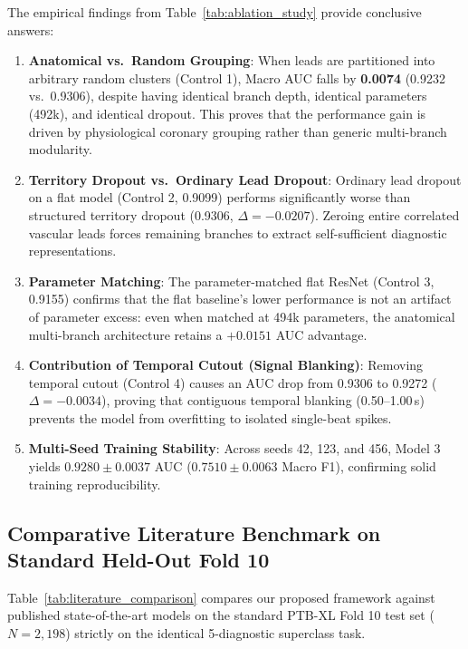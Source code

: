 \documentclass[5p,twocolumn,10pt]{elsarticle}
\begin{document}
The empirical findings from Table~\ref{tab:ablation_study} provide conclusive answers:
\begin{enumerate}
    \item \textbf{Anatomical vs.\ Random Grouping}: When leads are partitioned into arbitrary random clusters (Control 1), Macro AUC falls by \textbf{0.0074} (0.9232 vs.\ 0.9306), despite having identical branch depth, identical parameters (492k), and identical dropout. This proves that the performance gain is driven by physiological coronary grouping rather than generic multi-branch modularity.
    \item \textbf{Territory Dropout vs.\ Ordinary Lead Dropout}: Ordinary lead dropout on a flat model (Control 2, 0.9099) performs significantly worse than structured territory dropout (0.9306, $\Delta = -0.0207$). Zeroing entire correlated vascular leads forces remaining branches to extract self-sufficient diagnostic representations.
    \item \textbf{Parameter Matching}: The parameter-matched flat ResNet (Control 3, 0.9155) confirms that the flat baseline's lower performance is not an artifact of parameter excess: even when matched at 494k parameters, the anatomical multi-branch architecture retains a $+0.0151$ AUC advantage.
    \item \textbf{Contribution of Temporal Cutout (Signal Blanking)}: Removing temporal cutout (Control 4) causes an AUC drop from 0.9306 to 0.9272 ($\Delta = -0.0034$), proving that contiguous temporal blanking (0.50--1.00\,s) prevents the model from overfitting to isolated single-beat spikes.
    \item \textbf{Multi-Seed Training Stability}: Across seeds 42, 123, and 456, Model 3 yields $0.9280 \pm 0.0037$ AUC ($0.7510 \pm 0.0063$ Macro F1), confirming solid training reproducibility.
\end{enumerate}

\subsection{Comparative Literature Benchmark on Standard Held-Out Fold 10}
\label{sec:literature_benchmark}
Table~\ref{tab:literature_comparison} compares our proposed framework against published state-of-the-art models on the standard PTB-XL Fold 10 test set ($N = 2,198$) strictly on the identical 5-diagnostic superclass task.
\end{document}
